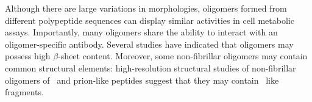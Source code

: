 Although there are large variations in morphologies, oligomers formed from different polypeptide sequences can display similar activities in cell metabolic assays.\cite{Bucciantini:2002un} Importantly, many oligomers share the ability to interact with an oligomer-specific antibody.\cite{Kayed:2003en} %
Several studies have indicated that oligomers may possess high $\beta$-sheet content.\cite{Chimon:2007du,Ahmed:2010p5694,Campioni:2010hz} %
Moreover, some non-fibrillar oligomers may contain common structural elements: high-resolution structural studies of non-fibrillar oligomers of \ and prion-like peptides suggest that they may contain \crossb\ like fragments.\cite{Walsh:2010p4761,Stroud:2012dp,Chimon:2007du}
 



